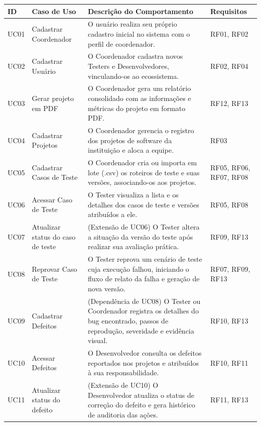 \clearpage

\begin{quadro}[!htb]
\centering
\caption{Descrição dos Casos de Uso do sistema Test-Manager e sua relação com os Requisitos Funcionais.}
\label{tab:casos_uso}
\footnotesize
\begin{tabularx}{\textwidth}{|l|p{3.2cm}|X|l|}
\hline
\textbf{ID} & \textbf{Caso de Uso} & \textbf{Descrição do Comportamento} & \textbf{Requisitos} \\ \hline
UC01 & Cadastrar Coordenador & O usuário realiza seu próprio cadastro inicial no sistema com o perfil de coordenador. & RF01, RF02 \\ \hline
UC02 & Cadastrar Usuário & O Coordenador cadastra novos Testers e Desenvolvedores, vinculando-os ao ecossistema. & RF02, RF04 \\ \hline
UC03 & Gerar projeto em PDF & O Coordenador gera um relatório consolidado com as informações e métricas do projeto em formato PDF. & RF12, RF13 \\ \hline
UC04 & Cadastrar Projetos & O Coordenador gerencia o registro dos projetos de software da instituição e aloca a equipe. & RF03 \\ \hline
UC05 & Cadastrar Casos de Teste & O Coordenador cria ou importa em lote (.csv) os roteiros de teste e suas versões, associando-os aos projetos. & RF05, RF06, RF07, RF08 \\ \hline
UC06 & Acessar Caso de Teste & O Tester visualiza a lista e os detalhes dos casos de teste e versões atribuídos a ele. & RF05, RF08 \\ \hline
UC07 & Atualizar status do caso de teste & (Extensão de UC06) O Tester altera a situação da versão do teste após realizar sua avaliação prática. & RF09, RF13 \\ \hline
UC08 & Reprovar Caso de Teste & O Tester reprova um cenário de teste cuja execução falhou, iniciando o fluxo de relato da falha e geração de nova versão. & RF07, RF09, RF13 \\ \hline
UC09 & Cadastrar Defeitos & (Dependência de UC08) O Tester ou Coordenador registra os detalhes do bug encontrado, passos de reprodução, severidade e evidência visual. & RF10, RF13 \\ \hline
UC10 & Acessar Defeitos & O Desenvolvedor consulta os defeitos reportados nos projetos e atribuídos à sua responsabilidade. & RF10, RF11 \\ \hline
UC11 & Atualizar status do defeito & (Extensão de UC10) O Desenvolvedor atualiza o status de correção do defeito e gera histórico de auditoria das ações. & RF11, RF13 \\ \hline
\end{tabularx}
\end{quadro}

